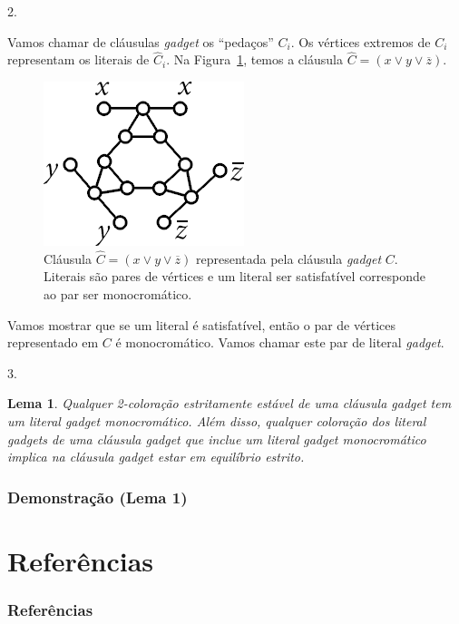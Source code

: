 \documentclass{beamer}
\newcommand{\cls}{\hat{C}}
\newcommand{\ov}{\overline}
\theoremstyle{plain}
\newtheorem{lemma-cnt}{Lema}
\begin{document}
\begin{frame}

  {\color{blue} 2.}

  Vamos chamar de cláusulas \textit{gadget} os ``pedaços'' $C_i$. Os vértices extremos de $C_i$
  representam os literais de $\cls_i$. Na Figura~\ref{fig:cls}, temos a cláusula $\cls=(x\vee
  y\vee\ov{z})$.
  \begin{figure}[h]
    \centering\includegraphics[scale=0.4]{imgs/clause_gadget.png}
    \captionsetup{justification=raggedright}
    \caption{\label{fig:cls} Cláusula $\cls=(x\vee y\vee\ov{z})$ representada pela cláusula
    \textit{gadget} $C$. Literais são pares de vértices e um literal ser satisfatível corresponde
    ao par ser monocromático.}
  \end{figure}
  \vspace{-0.3in}
  Vamos mostrar que se um literal é satisfatível, então o par de vértices representado em $C$ é
  monocromático. Vamos chamar este par de literal \textit{gadget}.

\end{frame}

\begin{frame}

  {\color{blue} 3.}
  \begin{lemma-cnt}
    Qualquer 2-coloração estritamente estável de uma cláusula \textit{gadget} tem um literal
    \textit{gadget} monocromático. Além disso, qualquer coloração dos literal \textit{gadgets} de
    uma cláusula \textit{gadget} que inclue um literal \textit{gadget} monocromático implica na
    cláusula \textit{gadget} estar em equilíbrio estrito.
  \end{lemma-cnt}
\end{frame}

\begin{frame}
  \frametitle{Demonstração (Lema 1)}
\end{frame}


\section[Referências]{Referências}
\begin{frame}[t,allowframebreaks]
  \frametitle{Referências}
  \nocite{*}
  \printbibliography[]
\end{frame}
\end{document}
